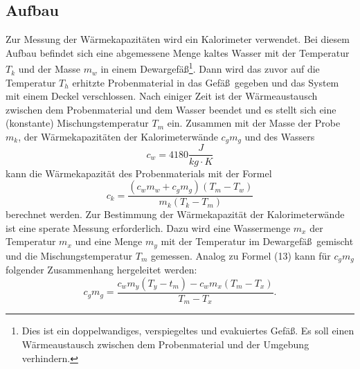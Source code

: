 \documentclass[11pt,ngerman,a4paper]{article}
\begin{document}
\subsection{Aufbau}
Zur Messung der W\"armekapazit\"aten wird ein  Kalorimeter verwendet.
Bei diesem Aufbau befindet sich eine abgemessene Menge kaltes Wasser mit der Temperatur $T_k$ und der Masse $m_w$ in einem Dewargef\"a\ss\footnote{Dies ist ein doppelwandiges, verspiegeltes und evakuiertes Gef\"a\ss. Es soll einen W\"armeaustausch zwischen dem Probenmaterial und der Umgebung verhindern.}. Dann wird das zuvor auf die Temperatur $T_h$ erhitzte Probenmaterial in das Gef\"a\ss\ gegeben und das System mit einem Deckel verschlossen. Nach einiger Zeit ist der W\"armeaustausch zwischen dem Probenmaterial und dem Wasser beendet und es stellt sich eine (konstante) Mischungstemperatur $T_m$ ein. Zusammen mit der Masse der Probe $m_k$, der W\"armekapazit\"aten der Kalorimeterw\"ande $c_gm_g$ und des Wassers 
\[c_w = 4180 \frac{J}{kg\cdot K}\]
kann die W\"armekapazit\"at des Probenmaterials mit der Formel 
\begin{equation}
\label{c_k}
c_k = \frac{(c_wm_w+c_gm_g)(T_m-T_w)}{m_k(T_k-T_m)}
\end{equation}
berechnet werden. Zur Bestimmung der W\"armekapazit\"at der Kalorimeterw\"ande ist eine sperate Messung erforderlich. Dazu wird eine Wassermenge $m_x$ der Temperatur $m_x$ und eine Menge $m_y$ mit der Temperatur im Dewargef\"a\ss\ gemischt und die Mischungstemperatur $T_m$ gemessen. Analog zu Formel (13) kann f\"ur $c_gm_g$ folgender Zusammenhang hergeleitet werden:
\begin{equation}
c_gm_g= \frac{c_wm_y(T_y-t_m)-c_wm_x(T_m-T_x)}{T_m-T_x}.
\end{equation}
\end{document}
